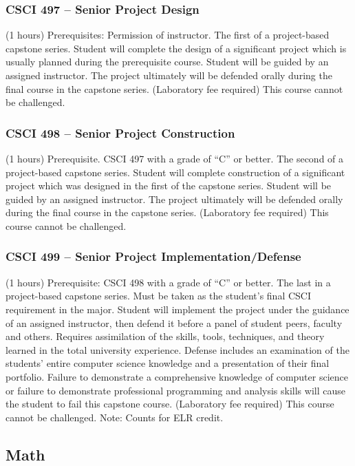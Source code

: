\subsubsection{CSCI 497 -- Senior Project Design}
(1 hours) Prerequisites: Permission of instructor. The first of a project-based capstone series. Student will complete the design of a significant project which is usually planned during the prerequisite course. Student will be guided by an assigned instructor. The project ultimately will be defended orally during the final course in the capstone series. (Laboratory fee required) This course cannot be challenged.

\clearpage

\subsubsection{CSCI 498 -- Senior Project Construction}
(1 hours) Prerequisite. CSCI 497 with a grade of “C” or better. The second of a project-based capstone series. Student will complete construction of a significant project which was designed in the first of the capstone series. Student will be guided by an assigned instructor. The project ultimately will be defended orally during the final course in the capstone series. (Laboratory fee required) This course cannot be challenged.

\subsubsection{CSCI 499 -- Senior Project Implementation/Defense}
(1 hours) Prerequisite: CSCI 498 with a grade of “C” or better. The last in a project-based capstone series. Must be taken as the student’s final CSCI requirement in the major. Student will implement the project under the guidance of an assigned instructor, then defend it before a panel of student peers, faculty and others. Requires assimilation of the skills, tools, techniques, and theory learned in the total university experience. Defense includes an examination of the students’ entire computer science knowledge and a presentation of their final portfolio. Failure to demonstrate a comprehensive knowledge of computer science or failure to demonstrate professional programming and analysis skills will cause the student to fail this capstone course. (Laboratory fee required) This course cannot be challenged. Note: Counts for ELR credit.


\subsection{Math}

